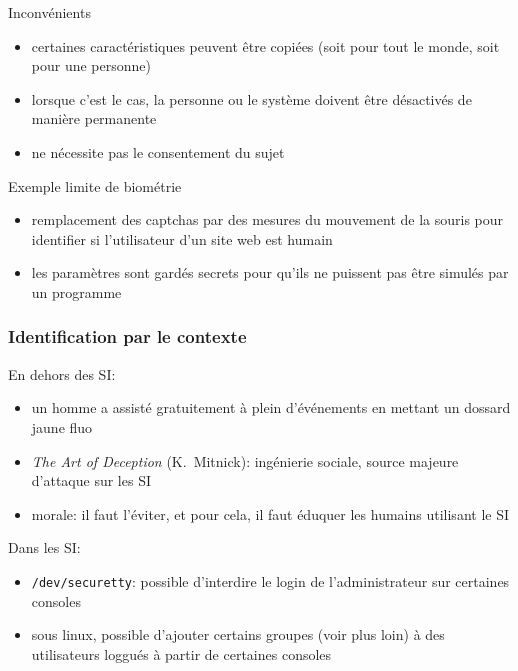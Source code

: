 \begin{reveals}
\begin{frame}
  \vfill

  \begin{block}{Inconvénients}
    \begin{itemize}
    \item certaines caractéristiques peuvent être copiées (soit pour
      tout le monde, soit pour une personne)
    \item lorsque c'est le cas, la personne ou le système doivent être
      désactivés de manière permanente
     \item ne nécessite pas le consentement du sujet
   \end{itemize}
  \end{block}

  \vfill

  \begin{block}{Exemple limite de biométrie}
    \begin{itemize}
    \item remplacement des captchas par des mesures du mouvement de la
      souris pour identifier si l'utilisateur d'un site web est humain
    \item les paramètres sont gardés secrets pour qu'ils ne puissent
      pas être simulés par un programme
    \end{itemize}
  \end{block}

  \vfill
\end{frame}


\begin{frame}
  \frametitle{Identification par le contexte}

  \vfill

  \begin{block}{En dehors des SI:}
    \begin{itemize}
    \item un homme a assisté gratuitement à plein d'événements en
      mettant un dossard jaune fluo
    \item \emph{The Art of Deception} (K.~Mitnick): ingénierie
      sociale, source majeure d'attaque sur les SI
    \item morale: il faut l'éviter, et pour cela, il faut éduquer les humains utilisant le SI
    \end{itemize}
  \end{block}

  \vfill

  \begin{block}{Dans les SI:}
    \begin{itemize}
    \item \texttt{/dev/securetty}: possible d'interdire le login de l'administrateur sur certaines consoles
    \item sous linux, possible d'ajouter certains groupes (voir plus
      loin) à des utilisateurs loggués à partir de certaines consoles
    \end{itemize}
  \end{block}


\end{frame}
\end{reveals}
